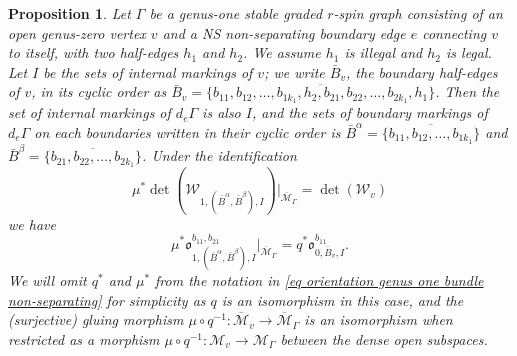 \documentclass[11pt,a4paper]{article}
\newtheorem{prop}[dummy]{Proposition}
\theoremstyle{definition}
\theoremstyle{remark}
\numberwithin{equation}{section}
\def\Mbar{{\overline{\mathcal M}}}
\begin{document}
\begin{prop}\label{prop: orientation open open g=1 non-separating}
      Let $\Gamma$ be a genus-one stable graded $r$-spin graph consisting of an open genus-zero vertex $v$ and a NS non-separating boundary edge $e$ connecting $v$ to itself, with two half-edges $h_1$ and $h_2$. We assume $h_1$ is illegal and $h_2$ is legal. Let $I$ be the sets of internal markings of $v$; we write $\bar{B}_v$, the boundary half-edges of $v$, in its cyclic order as $\bar{B}_v=\overline{\{b_{11},b_{12},\dots,b_{1k_1},h_2,b_{21},b_{22},\dots,b_{2k_1},h_1\}}$. Then the set of internal markings of $d_e \Gamma$ is also $I$, and the sets of boundary markings of $d_e \Gamma$ on each boundaries written in their cyclic order is $\bar{B}^\alpha=\overline{\{b_{11},b_{12},\dots,b_{1k_1}\}}$ and $\bar{B}^\beta=\overline{\{b_{21},b_{22},\dots,b_{2k_1}\}}$. Under the identification
      \begin{equation}\label{eq g=1 non-separating NS boundary node det decomp}
          \mu^* \det(\mathcal W_{1,(\bar{B}^\alpha,\bar{B}^\beta),I})\big|_{\Mbar_\Gamma} = \det(\mathcal W_{v})
      \end{equation}
       we have
        \begin{equation}\label{eq orientation genus one bundle non-separating}
        \mu^* {\mathfrak{o}}^{b_{11},b_{21}}_{1,(\bar{B}^\alpha,\bar{B}^\beta),I}\big |_{\Mbar_\Gamma^{}}=
         q^*{\mathfrak{o}}^{b_{11}}_{0,\bar B_v,I}.
         \end{equation}
         We will omit $q^*$ and $\mu^*$ from the notation in \eqref{eq orientation genus one bundle non-separating} for simplicity as $q$ is an isomorphism in this case, and the (surjective) gluing morphism $\mu\circ q^{-1}\colon \Mbar_v\to \Mbar_{\Gamma}$ is an isomorphism when restricted as a morphism  $\mu\circ q^{-1}\colon \mathcal{M}_v\to \mathcal{M}_\Gamma$ between the dense open subspaces.
\end{prop}
\end{document}
